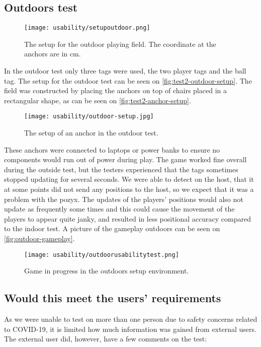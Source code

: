 \subsection{Outdoors test}
\begin{figure}[H]
    \centering
    \texttt{[image: usability/setupoutdoor.png]}
    \caption{The setup for the outdoor playing field. The coordinate at the anchors are in cm.}
    \label{fig:test2-outdoor-setup}
\end{figure}
\noindent
In the outdoor test only three tags were used, the two player tags and the ball tag.
The setup for the outdoor test can be seen on \autoref{fig:test2-outdoor-setup}.
The field was constructed by placing the anchors on top of chairs placed in a rectangular shape, as can be seen on \autoref{fig:test2-anchor-setup}.
\begin{figure}[H]
    \centering
    \texttt{[image: usability/outdoor-setup.jpg]}
    \caption{The setup of an anchor in the outdoor test.}
    \label{fig:test2-anchor-setup}
\end{figure}
\noindent
These anchors were connected to laptops or power banks to ensure no components would run out of power during play.
The game worked fine overall during the outside test, but the testers experienced that the tags sometimes stopped updating for several seconds.
We were able to detect on the host, that it at some points did not send any positions to the host, so we expect that it was a problem with the pozyx.
The updates of the players' positions would also not update as frequently some times and this could cause the movement of the players to appear quite janky, and resulted in less positional accuracy compared to the indoor test.
A picture of the gameplay outdoors can be seen on \autoref{fig:outdoor-gameplay}.
\begin{figure}[H]
    \centering
    \texttt{[image: usability/outdoorusabilitytest.png]}
    \caption{Game in progress in the outdoors setup environment.}
    \label{fig:outdoor-gameplay}
\end{figure}

\subsection{Would this meet the users' requirements}
As we were unable to test on more than one person due to safety concerns related to COVID-19, it is limited how much information was gained from external users.
The external user did, however, have a few comments on the test:

